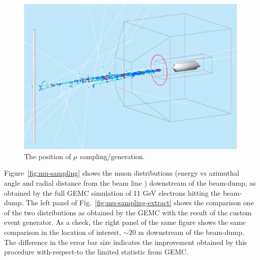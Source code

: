 \begin{figure}[h!] 
\center
\includegraphics[width=12cm]{figs/mu-gen.pdf}   
\caption{The position of $\mu$ sampling/generation.}
\label{fig:mu-gen}
\end{figure}


Figure~\ref{fig:mu-sampling} shows the muon distributions (energy vs azimuthal angle and radial distance from the beam line ) downstream of the beam-dump, as obtained by the full GEMC simulation of  11 GeV electrons hitting the beam-dump.
The left panel of Fig.~\ref{fig:mu-sampling-extract} shows the comparison one of the two distributions as obtained by the GEMC with the result of the custom event generator. 
As a check, the right panel of the same figure  shows the same comparison in the location of interest, $\sim 20$ m downstream of the beam-dump.
The difference in the error bar size indicates the improvement obtained by this procedure with-respect-to  the limited statistic from GEMC. 

